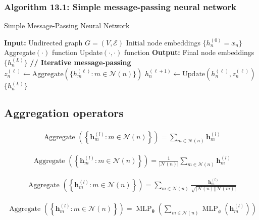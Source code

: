 \documentclass{article}
\begin{document}
\subsubsection{Algorithm 13.1: Simple message-passing neural network}

\begin{algorithm}[H]
\caption{Simple Message-Passing Neural Network}
\begin{algorithmic}[1]
\STATE \textbf{Input:} Undirected graph $G = (V, \mathcal{E})$
\STATE \quad Initial node embeddings $\{h_n^{(0)} = x_n\}$
\STATE \quad Aggregate$(\cdot)$ function
\STATE \quad Update$(\cdot, \cdot)$ function
\STATE \textbf{Output:} Final node embeddings $\{h_n^{(L)}\}$
\STATE \textbf{// Iterative message-passing}
    \STATE $z_n^{(\ell)} \gets \text{Aggregate}\left(\{h_m^{(\ell)} : m \in \mathcal{N}(n)\}\right)$
    \STATE $h_n^{(\ell + 1)} \gets \text{Update}\left(h_n^{(\ell)}, z_n^{(\ell)}\right)$
\ENDFOR
\RETURN $\{h_n^{(L)}\}$
\end{algorithmic}
\end{algorithm}

\subsection{Aggregation operators}
\begin{align*}
\text{ Aggregate }\left(\left\{\mathbf{h}_{m}^{(l)}: m \in \mathcal{N}(n)\right\}\right)=\sum_{m \in \mathcal{N}(n)} \mathbf{h}_{m}^{(l)} \tag{13.12}
\end{align*}

\begin{align*}
\text{ Aggregate }\left(\left\{\mathbf{h}_{m}^{(l)}: m \in \mathcal{N}(n)\right\}\right)=\frac{1}{|\mathcal{N}(n)|} \sum_{m \in \mathcal{N}(n)} \mathbf{h}_{m}^{(l)} \tag{13.13}
\end{align*}

\begin{align*}
\text{ Aggregate }\left(\left\{\mathbf{h}_{m}^{(l)}: m \in \mathcal{N}(n)\right\}\right)=\sum_{m \in \mathcal{N}(n)} \frac{\mathbf{h}_{m}^{(l)}}{\sqrt{|\mathcal{N}(n)||\mathcal{N}(m)|}} \tag{13.14}
\end{align*}

\begin{align*}
\text{ Aggregate }\left(\left\{\mathbf{h}_{m}^{(l)}: m \in \mathcal{N}(n)\right\}\right)=\operatorname{MLP}_{\boldsymbol{\theta}}\left(\sum_{m \in \mathcal{N}(n)} \operatorname{MLP}_{\phi}\left(\mathbf{h}_{m}^{(l)}\right)\right) \tag{13.15}
\end{align*}
\end{document}
